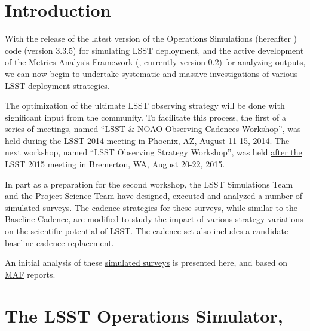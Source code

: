 
\section{Introduction}
\def\secname{cadexp:intro}\label{sec:\secname}

With the release of the latest version of the Operations Simulations
(hereafter \OpSim) code (version 3.3.5)  for simulating LSST
deployment, and the active development of the Metrics Analysis Framework
(\MAF,  currently version 0.2) for analyzing \OpSim outputs, we can
now begin to undertake systematic and  massive investigations of
various LSST deployment strategies.

The optimization of the ultimate LSST observing strategy will be done
with significant input from  the community. To facilitate this
process, the first of a series of meetings, named ``LSST \& NOAO
Observing Cadences Workshop'', was held during the
\href{https://project.lsst.org/meetings/ocw}{LSST 2014 meeting} in
Phoenix, AZ, August 11-15, 2014. The next workshop, named ``LSST
Observing Strategy Workshop'',  was held
\href{http://lsstsciencecollaborations.github.io/ObservingStrategy/}{after
the LSST 2015 meeting} in Bremerton, WA, August 20-22, 2015.

In part as a preparation for the second workshop, the LSST
Simulations Team and the Project Science Team have designed, executed
and analyzed a number of simulated surveys.  The cadence strategies
for these surveys, while similar to the Baseline Cadence, are modified to
study the impact of various strategy variations on the scientific
potential of LSST\@. The cadence set also includes a candidate baseline
cadence replacement.

An initial analysis of these
\href{http://opsim.lsst.org:8080}{simulated surveys} is presented here,
and based on \href{https://confluence.lsstcorp.org/display/SIM/MAF+documentation}{MAF}
reports.


\listofopsimdbs

\navigationbar


\section{The LSST Operations Simulator, \OpSim}
\def\secname{cadexp:opsim}\label{sec:\secname}

